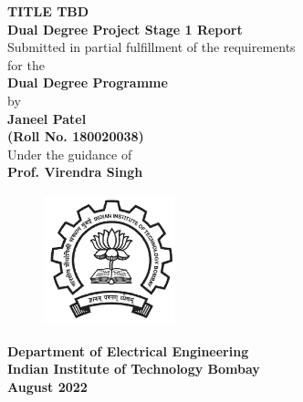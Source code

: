 \documentclass[a4paper,12pt, final]{report}
\begin{document}
  \thispagestyle{empty}
  \vspace*{1cm}
  {\centering     
  \textbf{\LARGE TITLE TBD}\\
  \vspace{1.20cm}
  \textbf{\large Dual Degree Project Stage 1 Report}\\
  \vspace{1cm}
  {Submitted in partial fulfillment of the requirements}\\
  \vspace{0.25cm}
  {for the}\\
  \vspace{1cm}
  \textbf{ Dual Degree Programme}\\
  \vspace{1.50cm}
  {by}\\
  \vspace{0.20cm}
  \textbf{\large Janeel Patel}\\
  \vspace{0.25cm}
  \textbf{\large (Roll No. 180020038)}\\
  \vspace{1.8cm}
  {Under the guidance of}\\
  \vspace{0.20cm}
  \textbf{\large Prof. Virendra Singh}\\
    \vspace{0.30cm}
  \vspace{1.450cm}
    \begin{figure}[htb]
    \begin{center}
    \includegraphics[height=1.5in,width=1.5in]{august22/img/iitblogo.png}
    \end{center}
    \end{figure}

    
  {\textbf{Department of Electrical Engineering}}\\
  {\textbf{Indian Institute of Technology Bombay}}\\
  {\textbf{August 2022}}
 
 }
 
\end{document}

